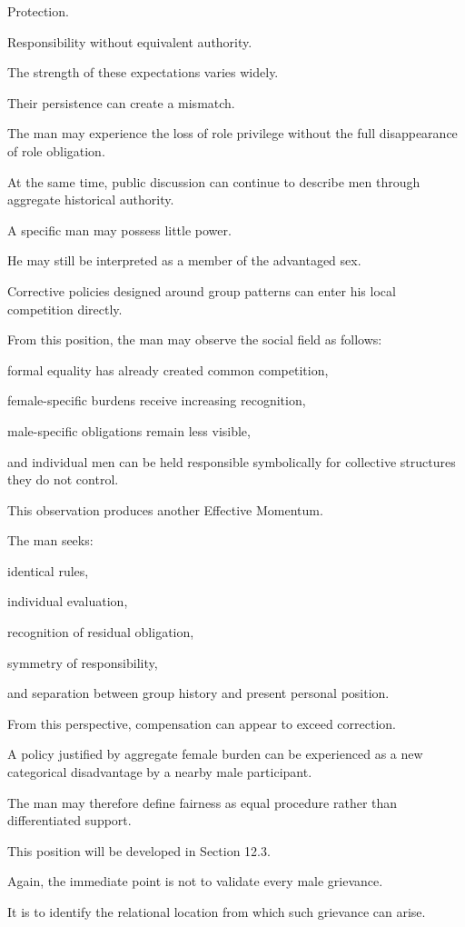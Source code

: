 Protection.

Responsibility without equivalent authority.

The strength of these expectations varies widely.

Their persistence can create a mismatch.

The man may experience the loss of role privilege without the full disappearance of role obligation.

At the same time, public discussion can continue to describe men through aggregate historical authority.

A specific man may possess little power.

He may still be interpreted as a member of the advantaged sex.

Corrective policies designed around group patterns can enter his local competition directly.

From this position, the man may observe the social field as follows:

formal equality has already created common competition,

female-specific burdens receive increasing recognition,

male-specific obligations remain less visible,

and individual men can be held responsible symbolically for collective structures they do not control.

This observation produces another Effective Momentum.

The man seeks:

identical rules,

individual evaluation,

recognition of residual obligation,

symmetry of responsibility,

and separation between group history and present personal position.

From this perspective, compensation can appear to exceed correction.

A policy justified by aggregate female burden can be experienced as a new categorical disadvantage by a nearby male participant.

The man may therefore define fairness as equal procedure rather than differentiated support.

This position will be developed in Section 12.3.

Again, the immediate point is not to validate every male grievance.

It is to identify the relational location from which such grievance can arise.

